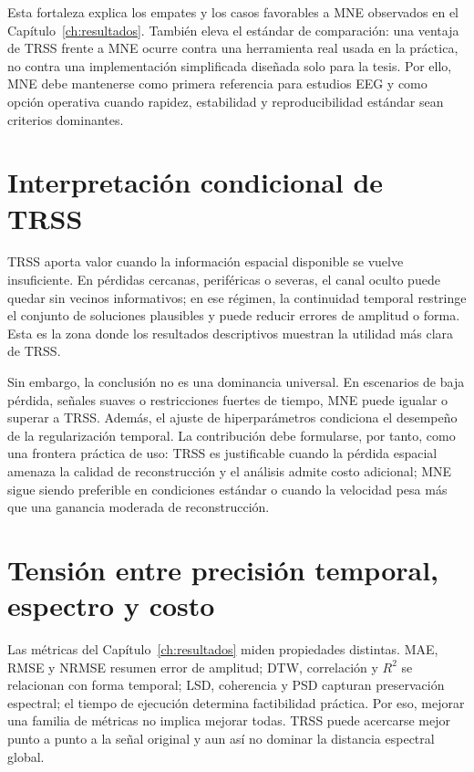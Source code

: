 Esta fortaleza explica los empates y los casos favorables a MNE observados en el Capítulo~\ref{ch:resultados}. También eleva el estándar de comparación: una ventaja de TRSS frente a MNE ocurre contra una herramienta real usada en la práctica, no contra una implementación simplificada diseñada solo para la tesis. Por ello, MNE debe mantenerse como primera referencia para estudios EEG y como opción operativa cuando rapidez, estabilidad y reproducibilidad estándar sean criterios dominantes.

\section{Interpretación condicional de TRSS}

TRSS aporta valor cuando la información espacial disponible se vuelve insuficiente. En pérdidas cercanas, periféricas o severas, el canal oculto puede quedar sin vecinos informativos; en ese régimen, la continuidad temporal restringe el conjunto de soluciones plausibles y puede reducir errores de amplitud o forma. Esta es la zona donde los resultados descriptivos muestran la utilidad más clara de TRSS.

Sin embargo, la conclusión no es una dominancia universal. En escenarios de baja pérdida, señales suaves o restricciones fuertes de tiempo, MNE puede igualar o superar a TRSS. Además, el ajuste de hiperparámetros condiciona el desempeño de la regularización temporal. La contribución debe formularse, por tanto, como una frontera práctica de uso: TRSS es justificable cuando la pérdida espacial amenaza la calidad de reconstrucción y el análisis admite costo adicional; MNE sigue siendo preferible en condiciones estándar o cuando la velocidad pesa más que una ganancia moderada de reconstrucción.

\section{Tensión entre precisión temporal, espectro y costo}

Las métricas del Capítulo~\ref{ch:resultados} miden propiedades distintas. MAE, RMSE y NRMSE resumen error de amplitud; DTW, correlación y $R^2$ se relacionan con forma temporal; LSD, coherencia y PSD capturan preservación espectral; el tiempo de ejecución determina factibilidad práctica. Por eso, mejorar una familia de métricas no implica mejorar todas. TRSS puede acercarse mejor punto a punto a la señal original y aun así no dominar la distancia espectral global.

